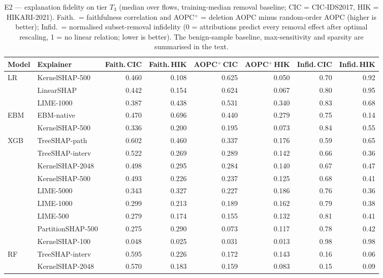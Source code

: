 \begin{table}[!htbp]
\centering
\caption{E2 --- explanation fidelity on tier $T_3$ (median over flows, training-median removal baseline; CIC = CIC-IDS2017, HIK = HIKARI-2021). Faith.\ = faithfulness correlation and AOPC$^+$ = deletion AOPC minus random-order AOPC (higher is better); Infid.\ = normalised subset-removal infidelity (0 = attributions predict every removal effect after optimal rescaling, 1 = no linear relation; lower is better). The benign-sample baseline, max-sensitivity and sparsity are summarised in the text.}
\label{tab:fidelity}
\scriptsize
\setlength{\tabcolsep}{3.5pt}
\begin{tabular}{llrrrrrr}
\toprule
\textbf{Model} & \textbf{Explainer} & \textbf{Faith.\,CIC} & \textbf{Faith.\,HIK} & \textbf{AOPC$^+$\,CIC} & \textbf{AOPC$^+$\,HIK} & \textbf{Infid.\,CIC} & \textbf{Infid.\,HIK} \\
\midrule
LR & KernelSHAP-500 & 0.460 & 0.108 & 0.625 & 0.050 & 0.70 & 0.92 \\
 & LinearSHAP & 0.442 & 0.154 & 0.624 & 0.067 & 0.80 & 0.95 \\
 & LIME-1000 & 0.387 & 0.438 & 0.531 & 0.340 & 0.83 & 0.68 \\
\midrule
EBM & EBM-native & 0.470 & 0.696 & 0.440 & 0.279 & 0.75 & 0.14 \\
 & KernelSHAP-500 & 0.336 & 0.200 & 0.195 & 0.073 & 0.84 & 0.55 \\
\midrule
XGB & TreeSHAP-path & 0.602 & 0.460 & 0.337 & 0.176 & 0.59 & 0.65 \\
 & TreeSHAP-interv & 0.522 & 0.269 & 0.289 & 0.142 & 0.66 & 0.36 \\
 & KernelSHAP-2048 & 0.498 & 0.295 & 0.284 & 0.140 & 0.67 & 0.47 \\
 & KernelSHAP-500 & 0.493 & 0.226 & 0.237 & 0.125 & 0.68 & 0.41 \\
 & LIME-5000 & 0.343 & 0.327 & 0.227 & 0.186 & 0.76 & 0.36 \\
 & LIME-1000 & 0.299 & 0.213 & 0.189 & 0.162 & 0.79 & 0.38 \\
 & LIME-500 & 0.279 & 0.174 & 0.155 & 0.132 & 0.81 & 0.41 \\
 & PartitionSHAP-500 & 0.275 & 0.290 & 0.073 & 0.117 & 0.78 & 0.42 \\
 & KernelSHAP-100 & 0.048 & 0.025 & 0.031 & 0.013 & 0.98 & 0.98 \\
\midrule
RF & TreeSHAP-interv & 0.595 & 0.226 & 0.172 & 0.143 & 0.16 & 0.06 \\
 & KernelSHAP-2048 & 0.570 & 0.183 & 0.159 & 0.083 & 0.15 & 0.09 \\

\end{tabular}
\end{table}
